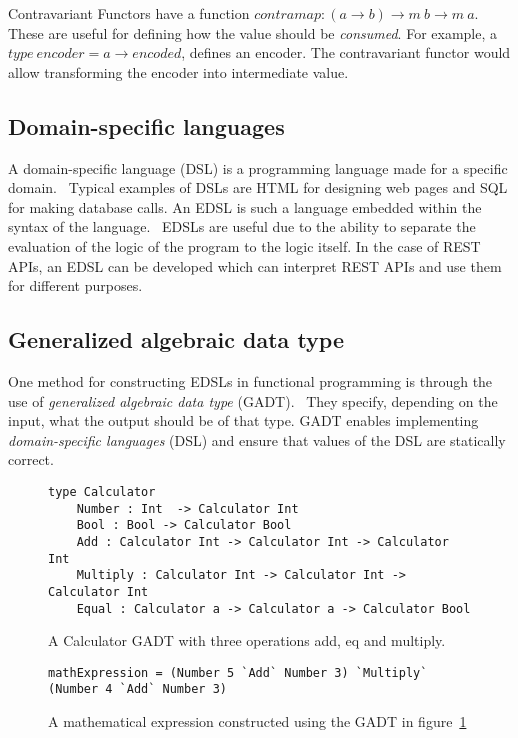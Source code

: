 Contravariant Functors have a function $contramap : (a\rightarrow b) \rightarrow
m\ b \rightarrow m\ a$.~\cite{bancerek2001miscellaneous} These are useful for
defining how the value should be \textit{consumed}. For example, a $type\
encoder = a\rightarrow encoded$, defines an encoder. The contravariant functor
would allow transforming the encoder into intermediate value.

\subsection{Domain-specific languages}

A domain-specific language (DSL) is a programming language made for a specific
domain.~\cite{elic2007systematic} Typical examples of DSLs are HTML for
designing web pages and SQL for making database calls. An EDSL is such a
language embedded within the syntax of the language.~\cite{hudak1996building}
EDSLs are useful due to the ability to separate the evaluation of the logic of
the program to the logic itself. In the case of REST APIs, an EDSL can be
developed which can interpret REST APIs and use them for different purposes. 

\subsection{Generalized algebraic data type}\label{gadt}

One method for constructing EDSLs in functional programming is through the use
of \textit{generalized algebraic data type} (GADT).~\cite{cheney2003first}
They specify, depending on the input, what the output should be of that type.
GADT enables implementing \textit{domain-specific languages} (DSL) and ensure
that values of the DSL are statically correct. 

\begin{figure}[H]
    \begin{lstlisting}
type Calculator 
    Number : Int  -> Calculator Int
    Bool : Bool -> Calculator Bool
    Add : Calculator Int -> Calculator Int -> Calculator Int
    Multiply : Calculator Int -> Calculator Int -> Calculator Int
    Equal : Calculator a -> Calculator a -> Calculator Bool
    \end{lstlisting}
    \caption{A Calculator GADT with three operations add, eq and multiply.}
    \label{gadtcalculator}
\end{figure}

\begin{figure}[H]
    \begin{lstlisting}
mathExpression = (Number 5 `Add` Number 3) `Multiply` (Number 4 `Add` Number 3)
    \end{lstlisting}
    \caption{A mathematical expression constructed using the GADT in
    figure~\ref{gadtcalculator}}
    \label{mathexpressiongadt}
\end{figure}


